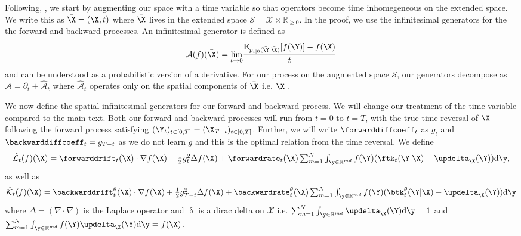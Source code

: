 Following, \cite{benton2022denoising}, we start by augmenting our space with a time variable so that operators become time inhomegeneous on the extended space. We write this as $\bar{\X} = (\X, t)$ where $\bar{\X}$ lives in the extended space $\mathcal{S} = \mathcal{X} \times \mathbb{R}_{\geq 0}$. In the proof, we use the infinitesimal generators for the the forward and backward processes. An infinitesimal generator is defined as 
\begin{equation}
    \mathcal{A}(f)(\bar{\X}) = \underset{t \rightarrow 0}{\text{lim}} \frac{\mathbb{E}_{p_{t|0}(\bar{\Y} | \bar{\X})} [ f(\bar{\Y}) ] - f(\bar{\X}) }{t}
\end{equation}
and can be understood as a probabilistic version of a derivative. For our process on the augmented space $\mathcal{S}$, our generators decompose as $\mathcal{A} = \partial_t + \hat{\mathcal{A}}_t$ where $\hat{\mathcal{A}}_t$ operates only on the spatial components of $\bar{\X}$ i.e. $\X$ \cite{benton2022denoising}.


We now define the spatial infinitesimal generators for our forward and backward process. We will change our treatment of the time variable compared to the main text. Both our forward and backward processes will run from $t=0$ to $t=T$, with the true time reversal of $\X$ following the forward process satisfying $( \Y_t)_{t \in [0, T]} = (\X_{T-t})_{t \in [0, T]}$. Further, we will write $\forwarddiffcoeff_t$ as $g_t$ and $\backwarddiffcoeff_t = g_{T-t}$ as we do not learn $g$ and this is the optimal relation from the time reversal. We define
\begin{equation}
\textstyle    \hat{\mathcal{L}}_t(f)(\X) = \forwarddrift_t(\X) \cdot \nabla f(\X) + \frac{1}{2} g_t^2 \Delta f (\X) + \forwardrate_t(\X) \inty f(\Y) ( \ftk_t( \Y | \X) - \updelta_{\X}(\Y) ) \rmd\y ,
\end{equation}
as well as 
\begin{equation}
    \textstyle \hat{\mathcal{K}}_t(f)(\X) = \backwarddrift_t^\theta(\X) \cdot \nabla f(\X) + \frac{1}{2} g_{T-t}^2 \Delta f (\X) + \backwardrate_t^\theta(\X) \inty f(\Y) ( \btk_t^\theta(\Y | \X) - \updelta_{\X}(\Y) ) \rmd\y 
\end{equation}
where $\Delta = (\nabla \cdot \nabla)$ is the Laplace operator and $\updelta$ is a dirac delta on $\mathcal{X}$ i.e. $\inty \updelta_{\X}(\Y) \rmd \y = 1$ and $\inty f(\Y) \updelta_{\X} (\Y) \rmd \y = f(\X)$. 


